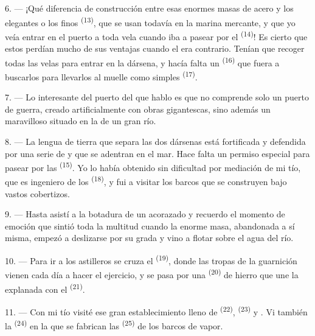 6. --- ¡Qué diferencia de construcción entre esas enormes masas de acero y
los elegantes  o los finos 
\textsuperscript{(13)}, que se usan todavía en la marina mercante, y que yo veía
entrar en el puerto a toda vela cuando iba a pasear por el
 \textsuperscript{(14)}! Es cierto que estos perdían mucho de sus
ventajas cuando el  era contrario. Tenían que recoger todas
las velas para entrar en la dársena, y hacía falta un 
\textsuperscript{(16)} que fuera a buscarlos para llevarlos al muelle como simples
 \textsuperscript{(17)}.

\VUsaut{3.0mm}
\VUsaut{3.0mm}

7. --- Lo interesante del puerto del que hablo es que no comprende solo un
puerto de guerra, creado artificialmente con obras gigantescas, sino
además un maravilloso  situado en la
 de un gran río.

8. --- La lengua de tierra que separa las dos dársenas está fortificada y
defendida por una serie de  y  que se
adentran en el mar. Hace falta un permiso especial para pasear por las
 \textsuperscript{(15)}. Yo lo había obtenido sin dificultad por
mediación de mi tío, que es ingeniero de los 
\textsuperscript{(18)}, y fui a visitar los barcos que se construyen bajo vastos
cobertizos.

9. --- Hasta asistí a la botadura de un acorazado y recuerdo el momento de
emoción que sintió toda la multitud cuando la enorme masa, abandonada a
sí misma, empezó a deslizarse por su grada y vino a flotar sobre el agua
del río.

10. --- Para ir a los astilleros se cruza el 
\textsuperscript{(19)}, donde las tropas de la guarnición vienen cada día a hacer
el ejercicio, y se pasa por una  \textsuperscript{(20)} de hierro que
une la explanada con el  \textsuperscript{(21)}.

\VUsaut{3.0mm}
\VUsaut{3.0mm}

11. --- Con mi tío visité ese gran establecimiento lleno de 
\textsuperscript{(22)},  \textsuperscript{(23)} y . Vi también la
 \textsuperscript{(24)} en la que se fabrican las
 \textsuperscript{(25)} de los barcos de vapor.

